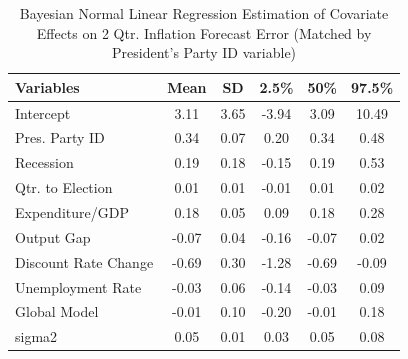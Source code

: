 \documentclass[a4paper]{article}\usepackage{graphicx, color}
\begin{document}

\begin{table}[ht]
\begin{center}
\caption{Bayesian Normal Linear Regression Estimation of Covariate Effects on 2 Qtr. Inflation Forecast Error (Matched by President's Party ID variable)}
\label{OutputPB}
{\small
\begin{tabular}{lccccc}
  \hline
Variables & Mean & SD & 2.5\% & 50\% & 97.5\% \\ 
  \hline
Intercept & 3.11 & 3.65 & -3.94 & 3.09 & 10.49 \\ 
  Pres. Party ID & 0.34 & 0.07 & 0.20 & 0.34 & 0.48 \\ 
  Recession & 0.19 & 0.18 & -0.15 & 0.19 & 0.53 \\ 
  Qtr. to Election & 0.01 & 0.01 & -0.01 & 0.01 & 0.02 \\ 
  Expenditure/GDP & 0.18 & 0.05 & 0.09 & 0.18 & 0.28 \\ 
  Output Gap & -0.07 & 0.04 & -0.16 & -0.07 & 0.02 \\ 
  Discount Rate Change & -0.69 & 0.30 & -1.28 & -0.69 & -0.09 \\ 
  Unemployment Rate & -0.03 & 0.06 & -0.14 & -0.03 & 0.09 \\ 
  Global Model & -0.01 & 0.10 & -0.20 & -0.01 & 0.18 \\ 
  sigma2 & 0.05 & 0.01 & 0.03 & 0.05 & 0.08 \\ 
   \hline
\end{tabular}
}
\end{center}
\end{table}



\end{document}
